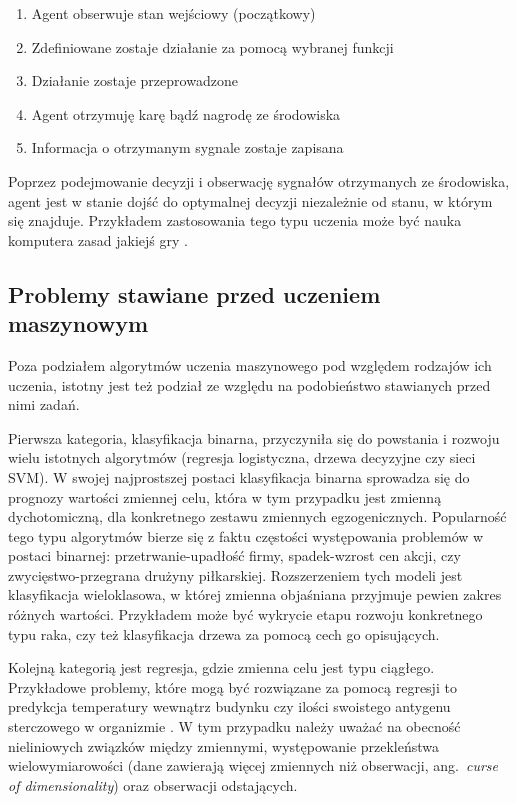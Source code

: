 \documentclass[12pt,a4paper,twoside,openany]{book}
\begin{document}
\begin{enumerate}
\item Agent obserwuje stan wejściowy (początkowy)
\item Zdefiniowane zostaje działanie za pomocą wybranej funkcji
\item Działanie zostaje przeprowadzone
\item Agent otrzymuję karę bądź nagrodę ze środowiska
\item Informacja o otrzymanym sygnale zostaje zapisana
\end{enumerate}
Poprzez podejmowanie decyzji i obserwację sygnałów otrzymanych ze środowiska, agent jest w stanie dojść do optymalnej decyzji niezależnie od stanu, w którym się znajduje. Przykładem zastosowania tego typu uczenia może być nauka komputera zasad jakiejś gry \citep{mnih2015}.



\subsection{Problemy stawiane przed uczeniem maszynowym}
Poza podziałem algorytmów uczenia maszynowego pod względem rodzajów ich uczenia, istotny jest też podział ze względu na podobieństwo stawianych przed nimi zadań. 

Pierwsza kategoria, klasyfikacja binarna, przyczyniła się do powstania i rozwoju wielu istotnych algorytmów (regresja logistyczna, drzewa decyzyjne czy sieci SVM). W swojej najprostszej postaci klasyfikacja binarna sprowadza się do prognozy wartości zmiennej celu, która w tym przypadku jest zmienną dychotomiczną, dla konkretnego zestawu zmiennych egzogenicznych. Popularność tego typu algorytmów bierze się z faktu częstości występowania problemów w postaci binarnej: przetrwanie-upadłość firmy, spadek-wzrost cen akcji, czy zwycięstwo-przegrana drużyny piłkarskiej. Rozszerzeniem tych modeli jest klasyfikacja wieloklasowa, w której zmienna objaśniana przyjmuje pewien zakres różnych wartości. Przykładem może być wykrycie etapu rozwoju konkretnego typu raka, czy też klasyfikacja drzewa za pomocą cech go opisujących. 

Kolejną kategorią jest regresja, gdzie zmienna celu jest typu ciągłego. Przykładowe problemy, które mogą być rozwiązane za pomocą regresji to predykcja temperatury wewnątrz budynku czy ilości swoistego antygenu sterczowego w organizmie \citep{qu2002}. W tym przypadku należy uważać na obecność nieliniowych związków między zmiennymi, występowanie przekleństwa wielowymiarowości (dane zawierają więcej zmiennych niż obserwacji, ang.~\textit{curse of dimensionality}) oraz obserwacji odstających. 
\end{document}
